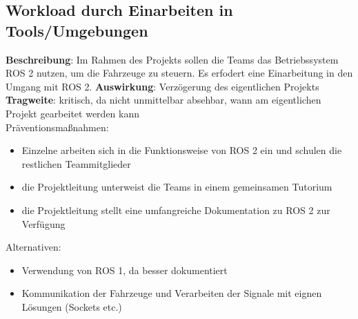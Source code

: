 \documentclass[a4paper, 12pt, titlepage]{scrartcl}
\begin{document}
	\subsection{Workload durch Einarbeiten in Tools/Umgebungen}
		\textbf{Beschreibung}: Im Rahmen des Projekts sollen die Teams das Betriebssystem ROS 2 nutzen, um die Fahrzeuge zu steuern. Es erfodert eine Einarbeitung in den Umgang mit ROS 2.
		\textbf{Auswirkung}: Verz\"ogerung des eigentlichen Projekts\\
		\textbf{Tragweite}: kritisch, da nicht unmittelbar absehbar, wann am eigentlichen Projekt gearbeitet werden kann\\
		Pr\"aventionsma\ss nahmen:
			\begin{itemize}
				\item Einzelne arbeiten sich in die Funktionsweise von ROS 2 ein und schulen die restlichen Teammitglieder
				\item die Projektleitung unterweist die Teams in einem gemeinsamen Tutorium
				\item die Projektleitung stellt eine umfangreiche Dokumentation zu ROS 2 zur Verf\"ugung
		\end{itemize}
		Alternativen:
			\begin{itemize}
				\item Verwendung von ROS 1, da besser dokumentiert
				\item Kommunikation der Fahrzeuge und Verarbeiten der Signale mit eignen L\"osungen (Sockets etc.)
			\end{itemize}
		
\end{document}
